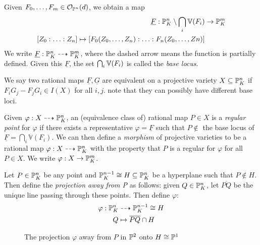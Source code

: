 \documentclass[10pt,a4paper,rgb]{article}
\begin{document}
Given $F_0, \ldots, F_m \in \mathcal{O}_{\P^n}(d)$, we obtain a map
\begin{align*}
\underline{F}: \P_K^n \setminus \bigcap_i \V(F_i)  &\to \P_K^m\\
[Z_0:\ldots:Z_n] \mapsto [F_0(Z_0, \ldots, Z_n):\ldots:F_n(Z_0,\ldots, Zn)]
\end{align*}
We write $\underline{F}:\P_K^n \dashrightarrow \P_K^m$, where the dashed arrow means the function is partially defined. Given this $\underline{F}$, the set $\bigcap_i \V(F_i)$ is called the \emph{base locus}.

We say two rational maps $\underline{F}, \underline{G}$ are equivalent on a projective variety $X \subseteq \P_K^n$ if $F_iG_j - F_jG_i \in I(X)$ for all $i,j$. note that they can possibly have different base loci.

Given $\varphi:X \dashrightarrow \P_K^n$, an (equivalence class of) rational map $P \in X$ is a \emph{regular point} for $\varphi$ if there exists a representative $\varphi = \underline{F}$ such that $P \notin$ the base locus of $\underline{F} = \bigcap_i \mathbb{V}(F_i)$. We can then define a \emph{morphism} of projective varieties to be a rational map $\varphi: X \dashrightarrow \P_K^n$ with the property that $P$ is a regular for $\varphi$ for all $P \in X$. We write $\varphi: X \to \P_K^m$.

Let $P \in \P_K^n$ be any point and $\P_K^{n-1} \cong H \subseteq \P_K^n$ be a hyperplane such that $P \notin H$. Then define the \emph{projection away from P} as follows: given $Q \in \P_K^n$, let $\overline{PQ}$ be the unique line passing through these points. Then define $\varphi$:
\begin{align*}
\varphi: \P_K^n &\dashrightarrow \P_K^{n-1} \cong H\\
Q &\mapsto \overline{PQ} \cap H
\end{align*}
\begin{figure}[H]
\centering
{}
\caption{The projection $\varphi$ away from $P$ in $\P^2$ onto $H \cong \P^1$}
\end{figure}
\end{document}
